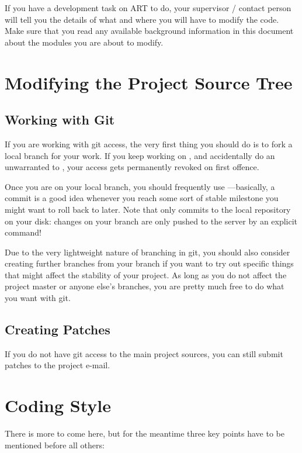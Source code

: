 If you have a development task on ART to do, your supervisor / contact person
will tell you the details of what and where you will have to modify the
code. Make sure that you read any available background information in this
document about the modules you are about to modify.

\chapter{Modifying the Project Source Tree}
\section{Working with Git}
\label{sec:Developing:commit}
If you are working with git access, the very first thing you should do is to fork a local branch for your work. If you keep working on , and accidentally do an unwarranted  to , your access gets permanently revoked on first offence.

Once you are on your local branch, you should frequently use 
---basically, a commit is a good idea whenever you reach some sort of stable milestone you might want to roll back to later. Note that   only commits to the local repository on your disk: changes on your branch are only pushed to the server by an explicit  command! 

Due to the very lightweight nature of branching in git, you should also consider creating further branches from your branch if you want to try out specific things that might affect the stability of your project. As long as you do not affect the project master or anyone else's branches, you are pretty much free to do what you want with git.
\section{Creating Patches}
If you do not have git access to the main project sources, you can still submit patches to the project e-mail.
\chapter{Coding Style}
\label{sec:Developing:style}
There is more to come here, but for the meantime three key points have to be
mentioned before all others:


